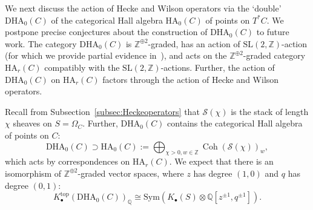 \documentclass [11pt,oneside,a4paper,mathscr]{amsart}
\theoremstyle{definition}
\newcommand{\Coh}{\operatorname{Coh}}
\begin{document}

\medskip

We next discuss the action of Hecke and Wilson operators via the `double' $\mathrm{DHA}_0(C)$ of the categorical Hall algebra $\mathrm{HA}_0(C)$ of points on $T^*C$. We postpone precise conjectures about the construction of $\mathrm{DHA}_0(C)$ to future work. 
The category $\mathrm{DHA}_0(C)$ is $\mathbb{Z}^{\oplus 2}$-graded, has an action of $\text{SL}(2,\mathbb{Z})$-action (for which we provide partial evidence in~\cite{CauPT}), and acts on the $\mathbb{Z}^{\oplus 2}$-graded category $\text{HA}_r(C)$ compatibly with the $\text{SL}(2,\mathbb{Z})$-actions. Further, the action of $\text{DHA}_0(C)$ on $\text{HA}_r(C)$ factors through the action of Hecke and Wilson operators.

Recall from Subsection~\ref{subsec:Heckeoperators} that $\mathcal{S}(\chi)$ is the stack of length $\chi$ sheaves on $S=\Omega_C$. 
 Further, $\text{DHA}_0(C)$ contains the categorical Hall algebra of points on $C$:
  \[\text{DHA}_0(C)\supset \text{HA}_0(C):=\bigoplus_{\chi>0,w\in\mathbb{Z}}\Coh(\mathcal{S}(\chi))_w,\] which acts by correspondences on $\text{HA}_r(C)$. 
We expect that there is an isomorphism of $\mathbb{Z}^{\oplus 2}$-graded vector spaces, where $z$ has degree $(1,0)$ and $q$ has degree $(0,1)$:
\[K^{\text{top}}_\bullet(\text{DHA}_0(C))_\mathbb{Q}\cong \text{Sym}\left(K_\bullet(S)\otimes \mathbb{Q}[z^{\pm 1}, q^{\pm 1}]\right).\]
  
\end{document}
